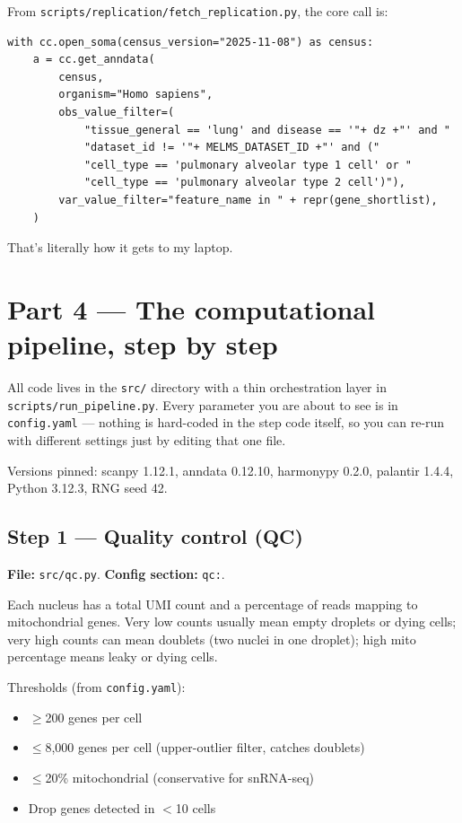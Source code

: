 \documentclass[11pt]{article}
\begin{document}
From \texttt{scripts/replication/fetch\_replication.py}, the core call is:
\begin{verbatim}
with cc.open_soma(census_version="2025-11-08") as census:
    a = cc.get_anndata(
        census,
        organism="Homo sapiens",
        obs_value_filter=(
            "tissue_general == 'lung' and disease == '"+ dz +"' and "
            "dataset_id != '"+ MELMS_DATASET_ID +"' and ("
            "cell_type == 'pulmonary alveolar type 1 cell' or "
            "cell_type == 'pulmonary alveolar type 2 cell')"),
        var_value_filter="feature_name in " + repr(gene_shortlist),
    )
\end{verbatim}

That's literally how it gets to my laptop.

\section{Part 4 --- The computational pipeline, step by step}

All code lives in the \texttt{src/} directory with a thin orchestration layer
in \texttt{scripts/run\_pipeline.py}. Every parameter you are about to see is
in \texttt{config.yaml} --- nothing is hard-coded in the step code itself, so
you can re-run with different settings just by editing that one file.

Versions pinned: scanpy 1.12.1, anndata 0.12.10, harmonypy 0.2.0,
palantir 1.4.4, Python 3.12.3, RNG seed 42.

\subsection{Step 1 --- Quality control (QC)}

\textbf{File:} \texttt{src/qc.py}. \textbf{Config section:} \texttt{qc:}.

Each nucleus has a total UMI count and a percentage of reads mapping to
mitochondrial genes. Very low counts usually mean empty droplets or dying
cells; very high counts can mean doublets (two nuclei in one droplet);
high mito percentage means leaky or dying cells.

Thresholds (from \texttt{config.yaml}):
\begin{itemize}
\item $\geq$200 genes per cell
\item $\leq$8{,}000 genes per cell (upper-outlier filter, catches doublets)
\item $\leq$20\% mitochondrial (conservative for snRNA-seq)
\item Drop genes detected in $<$10 cells
\end{itemize}
\end{document}
